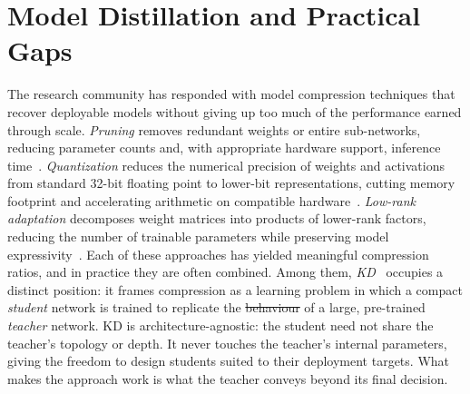 \documentclass[12pt, a4paper, twoside]{book}
\makeatletter
\numberwithin{equation}{chapter}
\theoremstyle{plain}
\theoremstyle{definition}
\theoremstyle{remark}
\newenvironment{foldable}{}{}
\providecommand{\DIFaddtex}[1]{{\protect\color{blue}\uwave{#1}}} %
\providecommand{\DIFdeltex}[1]{{\protect\color{red}\sout{#1}}} %
\providecommand{\DIFaddbegin}{} %
\providecommand{\DIFaddend}{} %
\providecommand{\DIFdelbegin}{} %
\providecommand{\DIFdelend}{} %
\providecommand{\DIFadd}[1]{\texorpdfstring{\DIFaddtex{#1}}{#1}} %
\providecommand{\DIFdel}[1]{\texorpdfstring{\DIFdeltex{#1}}{}} %
\newcommand{\DIFscaledelfig}{0.5}
\newlength{\DIFdelgraphicswidth} %
\newlength{\DIFdelgraphicsheight} %
\newcommand{\DIFaddincludegraphics}[2][]{{\color{blue}\fbox{\DIFOincludegraphics[#1]{#2}}}} %
\newcommand{\DIFdelincludegraphics}[2][]{%
\sbox{\DIFdelgraphicsbox}{\DIFOincludegraphics[#1]{#2}}%
\settoboxwidth{\DIFdelgraphicswidth}{\DIFdelgraphicsbox} %
\settoboxtotalheight{\DIFdelgraphicsheight}{\DIFdelgraphicsbox} %
\scalebox{\DIFscaledelfig}{%
\parbox[b]{\DIFdelgraphicswidth}{\usebox{\DIFdelgraphicsbox}\\[-\baselineskip] \rule{\DIFdelgraphicswidth}{0em}}\llap{\resizebox{\DIFdelgraphicswidth}{\DIFdelgraphicsheight}{%
\setlength{\unitlength}{\DIFdelgraphicswidth}%
\begin{picture}(1,1)%
\thicklines\linethickness{2pt} %
{\color[rgb]{1,0,0}\put(0,0){\framebox(1,1){}}}%
{\color[rgb]{1,0,0}\put(0,0){\line( 1,1){1}}}%
{\color[rgb]{1,0,0}\put(0,1){\line(1,-1){1}}}%
\end{picture}%
}\hspace*{3pt}}} %
} %
\DeclareRobustCommand{\DIFaddbegin}{\DIFOaddbegin \let\includegraphics\DIFaddincludegraphics} %
\DeclareRobustCommand{\DIFaddend}{\DIFOaddend \let\includegraphics\DIFOincludegraphics} %
\DeclareRobustCommand{\DIFdelbegin}{\DIFOdelbegin \let\includegraphics\DIFdelincludegraphics} %
\DeclareRobustCommand{\DIFdelend}{\DIFOaddend \let\includegraphics\DIFOincludegraphics} %
\let\sout@orig\sout %
\renewcommand{\sout}[1]{\ifmmode\text{\sout@orig{\ensuremath{#1}}}\else\sout@orig{#1}\fi} %
\makeatother
\begin{document}
 \section{Model Distillation and Practical Gaps} \label{sec:12-introduction-model}
\begin{foldable}
  The research community has responded with model compression techniques that recover deployable models without giving up too much of the performance earned through scale.
  \textit{Pruning} removes redundant weights or entire sub-networks, reducing parameter counts and, with appropriate hardware support, inference time~\cite{han2015learning,molchanov2016pruning}.
  \textit{Quantization} reduces the numerical precision of weights and activations from standard 32-bit floating point to lower-bit representations, cutting memory footprint and accelerating arithmetic on compatible hardware~\cite{hubara2018quantized,jacob2018quantization}.
  \textit{Low-rank adaptation} decomposes weight matrices into products of lower-rank factors, reducing the number of trainable parameters while preserving model expressivity~\cite{hu2022lora}.
  Each of these approaches has yielded meaningful compression ratios, and in practice they are often combined.
  Among them, \textit{\acl{KD}}~\cite{hinton2015distilling} occupies a distinct position: it frames compression as a learning problem in which a compact \textit{student} network is trained to replicate the \DIFdelbegin \DIFdel{behaviour }\DIFdelend \DIFaddbegin \DIFadd{behavior }\DIFaddend of a large, pre-trained \textit{teacher} network.
  \ac{KD} is architecture-agnostic: the student need not share the teacher's topology or depth.
  It never touches the teacher's internal parameters, giving the freedom to design students suited to their deployment targets.
  What makes the approach work is what the teacher conveys beyond its final decision.
\end{foldable}
\end{document}
